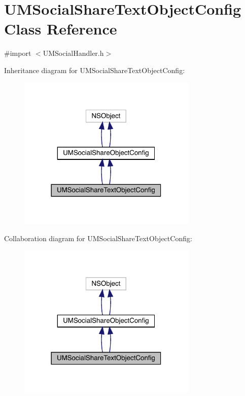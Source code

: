 \hypertarget{interface_u_m_social_share_text_object_config}{}\section{U\+M\+Social\+Share\+Text\+Object\+Config Class Reference}
\label{interface_u_m_social_share_text_object_config}


{\ttfamily \#import $<$U\+M\+Social\+Handler.\+h$>$}



Inheritance diagram for U\+M\+Social\+Share\+Text\+Object\+Config\+:\nopagebreak
\begin{figure}[H]
\begin{center}
\leavevmode
\includegraphics[width=242pt]{interface_u_m_social_share_text_object_config__inherit__graph}
\end{center}
\end{figure}


Collaboration diagram for U\+M\+Social\+Share\+Text\+Object\+Config\+:\nopagebreak
\begin{figure}[H]
\begin{center}
\leavevmode
\includegraphics[width=242pt]{interface_u_m_social_share_text_object_config__coll__graph}
\end{center}
\end{figure}
